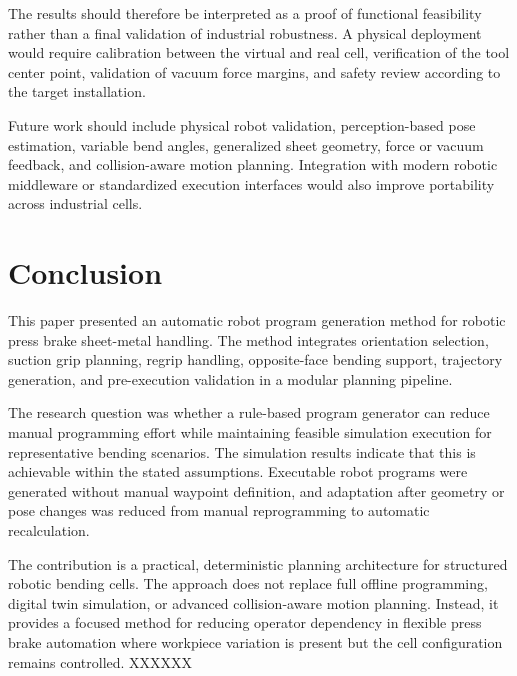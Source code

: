 \documentclass[journal]{IEEEtran}
\begin{document}
The results should therefore be interpreted as a proof of functional feasibility rather than a final validation of industrial robustness. A physical deployment would require calibration between the virtual and real cell, verification of the tool center point, validation of vacuum force margins, and safety review according to the target installation.

Future work should include physical robot validation, perception-based pose estimation, variable bend angles, generalized sheet geometry, force or vacuum feedback, and collision-aware motion planning. Integration with modern robotic middleware or standardized execution interfaces would also improve portability across industrial cells.

\section{Conclusion}
This paper presented an automatic robot program generation method for robotic press brake sheet-metal handling. The method integrates orientation selection, suction grip planning, regrip handling, opposite-face bending support, trajectory generation, and pre-execution validation in a modular planning pipeline.

The research question was whether a rule-based program generator can reduce manual programming effort while maintaining feasible simulation execution for representative bending scenarios. The simulation results indicate that this is achievable within the stated assumptions. Executable robot programs were generated without manual waypoint definition, and adaptation after geometry or pose changes was reduced from manual reprogramming to automatic recalculation.

The contribution is a practical, deterministic planning architecture for structured robotic bending cells. The approach does not replace full offline programming, digital twin simulation, or advanced collision-aware motion planning. Instead, it provides a focused method for reducing operator dependency in flexible press brake automation where workpiece variation is present but the cell configuration remains controlled. XXXXXX



\end{document}
